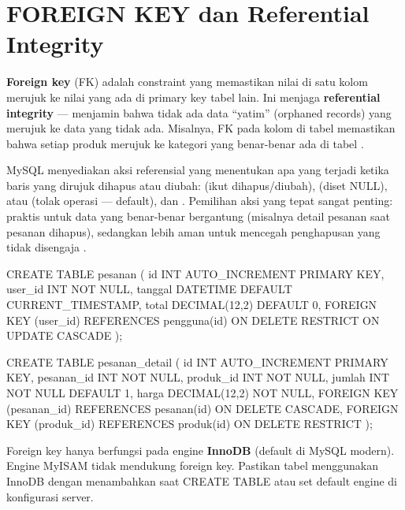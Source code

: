 \section{FOREIGN KEY dan Referential Integrity}

\textbf{Foreign key} (FK) adalah constraint yang memastikan nilai di satu kolom merujuk ke nilai yang ada di primary key tabel lain. Ini menjaga \textbf{referential integrity} --- menjamin bahwa tidak ada data ``yatim'' (orphaned records) yang merujuk ke data yang tidak ada. Misalnya, FK pada kolom  di tabel  memastikan bahwa setiap produk merujuk ke kategori yang benar-benar ada di tabel  \cite{mysqlDocs}.

MySQL menyediakan aksi referensial yang menentukan apa yang terjadi ketika baris yang dirujuk dihapus atau diubah:  (ikut dihapus/diubah),  (diset NULL),  atau  (tolak operasi --- default), dan . Pemilihan aksi yang tepat sangat penting:  praktis untuk data yang benar-benar bergantung (misalnya detail pesanan saat pesanan dihapus), sedangkan  lebih aman untuk mencegah penghapusan yang tidak disengaja \cite{mysqlGettingStarted}.

\begin{webcode}[language=SQL, caption={FOREIGN KEY dengan aksi referensial}]
CREATE TABLE pesanan (
  id      INT AUTO_INCREMENT PRIMARY KEY,
  user_id INT NOT NULL,
  tanggal DATETIME DEFAULT CURRENT_TIMESTAMP,
  total   DECIMAL(12,2) DEFAULT 0,
  FOREIGN KEY (user_id) REFERENCES pengguna(id)
    ON DELETE RESTRICT
    ON UPDATE CASCADE
);

CREATE TABLE pesanan_detail (
  id         INT AUTO_INCREMENT PRIMARY KEY,
  pesanan_id INT NOT NULL,
  produk_id  INT NOT NULL,
  jumlah     INT NOT NULL DEFAULT 1,
  harga      DECIMAL(12,2) NOT NULL,
  FOREIGN KEY (pesanan_id) REFERENCES pesanan(id) ON DELETE CASCADE,
  FOREIGN KEY (produk_id) REFERENCES produk(id) ON DELETE RESTRICT
);
\end{webcode}

\begin{catatan}
Foreign key hanya berfungsi pada engine \textbf{InnoDB} (default di MySQL modern). Engine MyISAM tidak mendukung foreign key. Pastikan tabel menggunakan InnoDB dengan menambahkan  saat CREATE TABLE atau set default engine di konfigurasi server.
\end{catatan}


